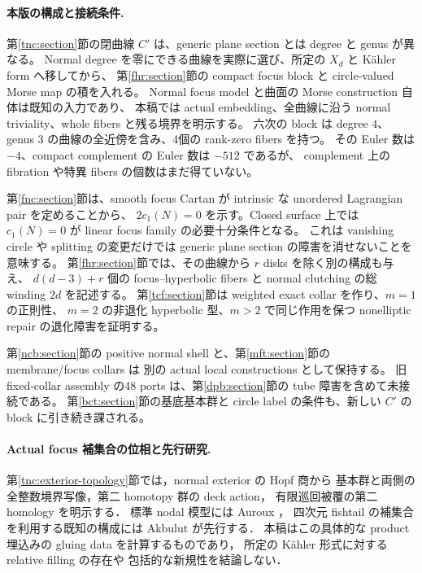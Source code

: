 \documentclass[11pt,a4paper]{article}
\theoremstyle{definition}
\begin{document}
\paragraph{本版の構成と接続条件.}
第\ref{tnc:section}節の閉曲線 $C'$ は、generic plane section とは degree と genus が異なる。
Normal degree を零にできる曲線を実際に選び、所定の $X_d$ と K\"ahler form へ移してから、
第\ref{fhr:section}節の compact focus block と circle-valued Morse map の積を入れる。
Normal focus model と曲面の Morse construction 自体は既知の入力であり、
本稿では actual embedding、全曲線に沿う normal triviality、whole fibers と残る境界を明示する。
六次の block は degree $4$、genus $3$ の曲線の全近傍を含み、4個の rank-zero fibers を持つ。
その Euler 数は $-4$、compact complement の Euler 数は $-512$ であるが、
complement 上の fibration や特異 fibers の個数はまだ得ていない。

第\ref{fnc:section}節は、smooth focus Cartan が intrinsic な unordered Lagrangian pair を定めることから、
$2c_1(N)=0$ を示す。Closed surface 上では $c_1(N)=0$ が linear focus family の必要十分条件となる。
これは vanishing circle や splitting の変更だけでは generic plane section の障害を消せないことを意味する。
第\ref{fhr:section}節では、その曲線から $r$ disks を除く別の構成も与え、
$d(d-3)+r$ 個の focus--hyperbolic fibers と normal clutching の総 winding $2d$ を記述する。
第\ref{tcf:section}節は weighted exact collar を作り、$m=1$ の正則性、
$m=2$ の非退化 hyperbolic 型、$m>2$ で同じ作用を保つ nonelliptic repair の退化障害を証明する。

第\ref{ncb:section}節の positive normal shell と、第\ref{mft:section}節の membrane/focus collars は
別の actual local constructions として保持する。
旧 fixed-collar assembly の48 ports は、第\ref{dpb:section}節の tube 障害を含めて未接続である。
第\ref{bct:section}節の基底基本群と circle label の条件も、新しい $C'$ の block に引き続き課される。

\paragraph{Actual focus 補集合の位相と先行研究.}
第\ref{tnc:exterior-topology}節では，normal exterior の Hopf 商から
基本群と両側の全整数境界写像，第二 homotopy 群の deck action，
有限巡回被覆の第二 homology を明示する．
標準 nodal 模型には Auroux \cite[Section~5.1]{auroux-local}，
四次元 fishtail の補集合を利用する既知の構成には
Akbulut \cite[Introduction]{akbulut-double-fishtail}が先行する．
本稿はこの具体的な product 埋込みの gluing data を計算するものであり，
所定の K\"ahler 形式に対する relative filling の存在や
包括的な新規性を結論しない．
\end{document}
